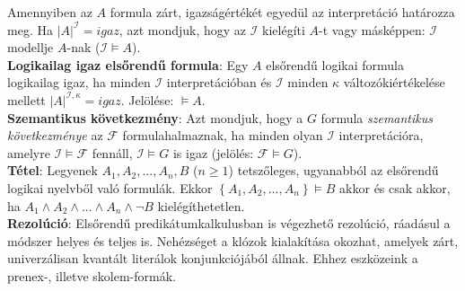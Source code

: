 \documentclass[margin=0px]{article}
\begin{document}
Amennyiben az $A$ formula zárt, igazságértékét egyedül az interpretáció határozza meg. Ha $|A|^{\mathcal{I}} = igaz$,
azt mondjuk, hogy az $\mathcal{I}$ kielégíti $A$-t vagy másképpen: $\mathcal{I}$ modellje $A$-nak ($\mathcal{I} \models A$).\\

\noindent \textbf{Logikailag igaz elsőrendű formula}: Egy $A$ elsőrendű logikai formula logikailag igaz,
ha minden $\mathcal{I}$ interpretációban és $\mathcal{I}$ minden $\kappa$ változókiértékelése mellett
$|A|^{\mathcal{I},\kappa} = igaz$. Jelölése: $\models A$.\\

\noindent \textbf{Szemantikus következmény}: Azt mondjuk, hogy a $G$ formula \textit{szemantikus következménye} az
$\mathcal{F}$ formulahalmaznak, ha minden olyan $\mathcal{I}$ interpretációra, amelyre $\mathcal{I} \models \mathcal{F}$
fennáll, $\mathcal{I} \models G$ is igaz (jelölés: $\mathcal{F} \models G$).\\

\noindent \textbf{Tétel}: Legyenek $A_{1}, A_{2}, ..., A_{n}, B$ ($n \geq 1$) tetszőleges, ugyanabból az elsőrendű logikai nyelvből
való formulák. Ekkor $\left\{A_{1}, A_{2}, ..., A_{n}\right\} \models B$ akkor és csak akkor, ha
$A_{1} \wedge A_{2} \wedge ... \wedge A_{n} \wedge \neg B$ kielégíthetetlen.\\

\noindent \textbf{Rezolúció}: Elsőrendű predikátumkalkulusban is végezhető rezolúció, ráadásul a módszer
helyes és teljes is. Nehézséget a klózok kialakítása okozhat, amelyek zárt,
univerzálisan kvantált literálok konjunkciójából állnak. Ehhez eszközeink a
prenex-, illetve skolem-formák.
\end{document}
